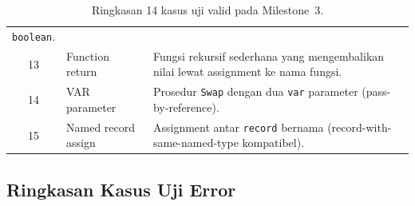 \documentclass[11pt,a4paper]{article}
\begin{document}
\begin{table}[H]
\begin{tabularx}{\textwidth}{c l X}
                             \texttt{boolean}. \\
13 & Function return       & Fungsi rekursif sederhana yang mengembalikan
                             nilai lewat assignment ke nama fungsi. \\
14 & VAR parameter         & Prosedur \texttt{Swap} dengan dua \texttt{var}
                             parameter (pass-by-reference). \\
15 & Named record assign   & Assignment antar \texttt{record} bernama
                             (record-with-same-named-type kompatibel). \\
\bottomrule
\end{tabularx}
\caption{Ringkasan 14 kasus uji valid pada Milestone~3.}
\label{tab:tests-valid}
\end{table}

\subsection{Ringkasan Kasus Uji Error}
\end{document}
